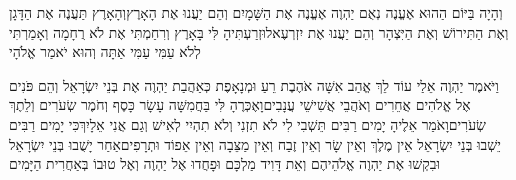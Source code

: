 \documentclass[../main/main.tex]{subfiles}
\begin{document}
\begin{multicols*}{\ncols}
וְהָיָה בַּיּוֹם הַהוּא אֶעֱנֶה נְאֻם יַהְוֶה אֶעֱנֶה אֶת הַשָּׁמָיִם וְהֵם יַעֲנוּ אֶת הָאָרֶץ\PreVerseSpace{}וְהָאָרֶץ תַּעֲנֶה אֶת הַדָּגָן וְאֶת הַתִּירוֹשׁ וְאֶת הַיִּצְהָר וְהֵם יַעֲנוּ אֶת יִזְרְעֶאל\PreVerseSpace{}וּזְרַעְתִּיהָ לִּי בָּאָרֶץ וְרִחַמְתִּי אֶת לֹא רֻחָמָה וְאָמַרְתִּי לְלֹא עַמִּי עַמִּי אַתָּה וְהוּא יֹאמַר אֱלֹהָי\OpenSection{}\par
{}וַיֹּאמֶר יַהְוֶה אֵלַי עוֹד לֵךְ אֱהַב אִשָּׁה אֹהֶבֶת\SubEnd{} רֵעַ וּמְנָאָפֶת כְּאַהֲבַת יַהְוֶה אֶת בְּנֵי יִשְׂרָאֵל וְהֵם פֹּנִים אֶל אֱלֹהִים אֲחֵרִים וְאֹהֲבֵי אֲשִׁישֵׁי עֲנָבִים\PreVerseSpace{}וָאֶכְּרֶהָ לִּי בַּחֲמִשָּׁה עָשָׂר כָּסֶף וְחֹמֶר שְׂעֹרִים וְלֵתֶךְ שְׂעֹרִים\PreVerseSpace{}וָאֹמַר אֵלֶיהָ יָמִים רַבִּים תֵּשְׁבִי לִי לֹא תִזְנִי וְלֹא תִהְיִי לְאִישׁ וְגַם אֲנִי אֵלָיִךְ\PreVerseSpace{}כִּי יָמִים רַבִּים יֵשְׁבוּ בְּנֵי יִשְׂרָאֵל אֵין מֶלֶךְ וְאֵין שָׂר וְאֵין זֶבַח וְאֵין מַצֵּבָה וְאֵין אֵפוֹד וּתְרָפִים\PreVerseSpace{}אַחַר יָשֻׁבוּ בְּנֵי יִשְׂרָאֵל וּבִקְשׁוּ אֶת יַהְוֶה אֱלֹהֵיהֶם וְאֵת דָּוִיד מַלְכָּם וּפָחֲדוּ אֶל יַהְוֶה וְאֶל טוּבוֹ בְּאַחֲרִית הַיָּמִים\OpenSection{}\par

\end{multicols*}
\end{document}
